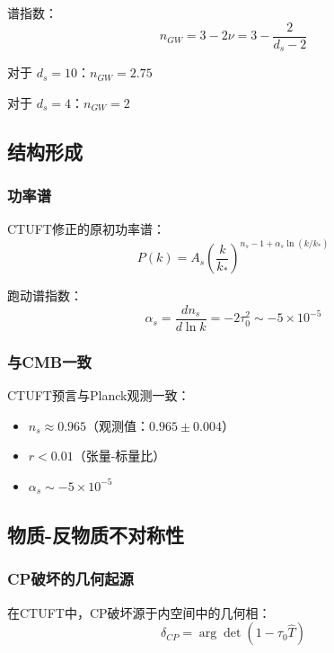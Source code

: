 谱指数：
\begin{equation}
    n_{GW} = 3 - 2\nu = 3 - \frac{2}{d_s - 2}
\end{equation}

对于 $d_s = 10$：$n_{GW} = 2.75$

对于 $d_s = 4$：$n_{GW} = 2$

\subsection{结构形成}

\subsubsection{功率谱}

CTUFT修正的原初功率谱：
\begin{equation}
    P(k) = A_s \left(\frac{k}{k_*}\right)^{n_s - 1 + \alpha_s \ln(k/k_*)}
\end{equation}

跑动谱指数：
\begin{equation}
    \alpha_s = \frac{dn_s}{d\ln k} = -2\tau_0^2 \sim -5 \times 10^{-5}
\end{equation}

\subsubsection{与CMB一致}

CTUFT预言与Planck观测一致：
\begin{itemize}
    \item $n_s \approx 0.965$（观测值：$0.965 \pm 0.004$）
    \item $r < 0.01$（张量-标量比）
    \item $\alpha_s \sim -5 \times 10^{-5}$
\end{itemize}

\subsection{物质-反物质不对称性}

\subsubsection{CP破坏的几何起源}

在CTUFT中，CP破坏源于内空间中的几何相：
\begin{equation}
    \delta_{CP} = \arg\det(1 - \tau_0 \hat{T})
\end{equation}

